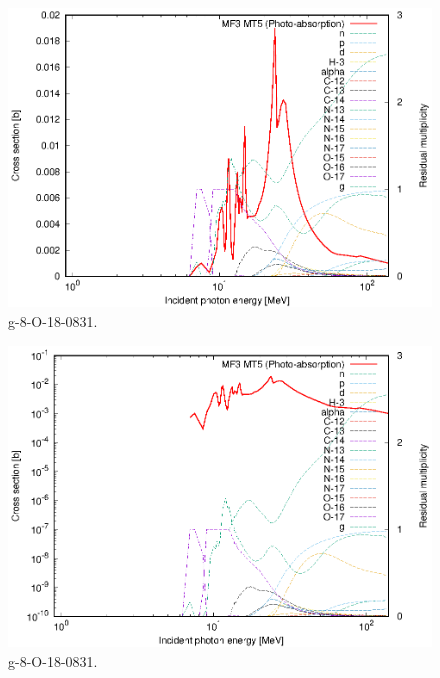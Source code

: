 \begin{figure}
 \includegraphics[width=\linewidth]{eps/g_8-O-18_0831.eps}
  \caption{g-8-O-18-0831.}
\end{figure}
\begin{figure}
 \includegraphics[width=\linewidth]{eps-log/g_8-O-18_0831.eps}
 \caption{g-8-O-18-0831.}
\end{figure}
\newpage \clearpage


